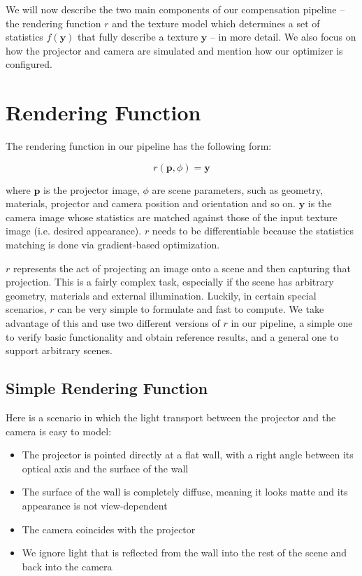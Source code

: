 We will now describe the two main components of our compensation pipeline -- the rendering function \(r\) and the texture model which determines a set of statistics \(f(\bm{y})\) that fully describe a texture \(\bm{y}\) -- in more detail. We also focus on how the projector and camera are simulated and mention how our optimizer is configured.

\section{Rendering Function}
\label{section:methods-rendering_function}

The rendering function in our pipeline has the following form:

\begin{equation}
    \label{eq:rendering_function}
    r(\bm{p}, \phi) = \bm{y}  
\end{equation}

where \(\bm{p}\) is the projector image, \(\phi\) are scene parameters, such as geometry, materials, projector and camera position and orientation and so on. \(\bm{y}\) is the camera image whose statistics are matched against those of the input texture image (i.e. desired appearance). \(r\) needs to be differentiable because the statistics matching is done via gradient-based optimization.

\(r\) represents the act of projecting an image onto a scene and then capturing that projection. This is a fairly complex task, especially if the scene has arbitrary geometry, materials and external illumination. Luckily, in certain special scenarios, \(r\) can be very simple to formulate and fast to compute. We take advantage of this and use two different versions of \(r\) in our pipeline, a simple one to verify basic functionality and obtain reference results, and a general one to support arbitrary scenes.

\subsection{Simple Rendering Function}
\label{section:methods-rendering_function-simple}

Here is a scenario in which the light transport between the projector and the camera is easy to model:

\begin{itemize}
    \item The projector is pointed directly at a flat wall, with a right angle between its optical axis and the surface of the wall
    \item The surface of the wall is completely diffuse, meaning it looks matte and its appearance is not view-dependent
    \item The camera coincides with the projector
    \item We ignore light that is reflected from the wall into the rest of the scene and back into the camera
\end{itemize}

